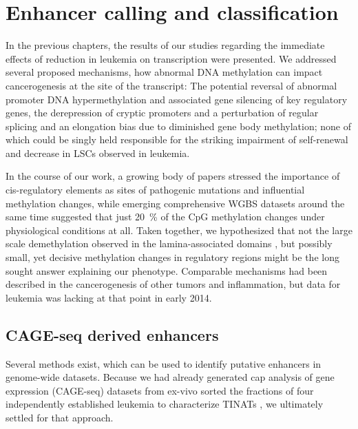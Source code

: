 \chapter{Enhancer calling and classification}
\label{chap:r:enhancers:calling}
\minitoc

In the previous chapters, the results of our studies regarding the immediate effects of  reduction in \mllafnine leukemia on transcription were presented. We addressed several proposed mechanisms, how abnormal DNA methylation can impact cancerogenesis at the site of the transcript: The potential reversal of abnormal promoter DNA hypermethylation and associated gene silencing of key regulatory genes\cite{Cai2017}, the derepression of cryptic promoters and a perturbation of regular splicing\cite{Brocks2017} and an elongation bias due to diminished gene body methylation\cite{Mendizabal2017}; none of which could be singly held responsible for the striking impairment of self-renewal and decrease in LSCs observed in \dnmtchip leukemia. 

In the course of our work, a growing body of papers stressed the importance of cis-regulatory elements as sites of pathogenic mutations  and influential methylation changes\cite{Stadler2011,Hon2013,Kieffer-Kwon2013,Schlesinger2013,Varley2013,Sheaffer2014}, while emerging comprehensive WGBS datasets around the same time suggested that just \SI{20}{\percent} of the CpG methylation changes under physiological conditions at all\cite{Ziller2013}. Taken together, we hypothesized that not the large scale demethylation observed in the lamina-associated domains , but possibly small, yet decisive methylation changes in regulatory regions might be the long sought answer explaining our phenotype. Comparable mechanisms had been described in the cancerogenesis of other tumors\cite{Aran2013,Aran2014} and inflammation\cite{Pacis2015}, but data for \mllafnine leukemia was lacking at that point in early 2014.

\section{CAGE-seq derived enhancers}
\label{chap:r:enhancers:cage}\label{chap:r:enhancers:intersection}

\fyfrank

Several methods exist, which can be used to identify putative enhancers in genome-wide datasets. Because we had already generated cap analysis of gene expression (CAGE-seq) \cite{Carninci1996,Shiraki2003,Takahashi2012} datasets from ex-vivo sorted the \kitpos fractions of four independently established leukemia to characterize TINATs , we ultimately settled for that approach. 

